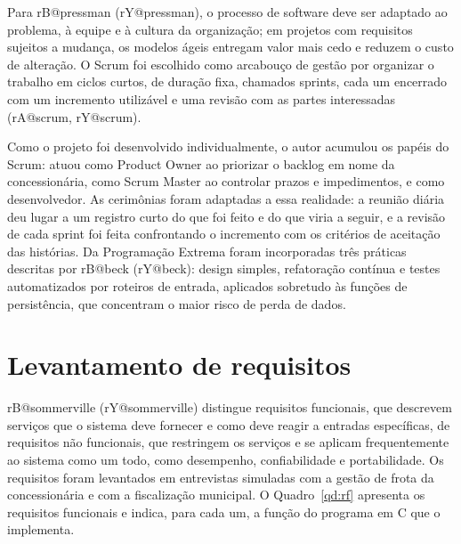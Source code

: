 \documentclass[12pt,a4paper,oneside]{report}
\makeatletter
\renewcommand{\cite}[1]{(\csname rA@#1\endcsname, \csname rY@#1\endcsname)}
\newcommand{\citeonline}[1]{\csname rB@#1\endcsname{} (\csname rY@#1\endcsname)}
\makeatother
\begin{document}
Para \citeonline{pressman}, o processo de software deve ser adaptado ao problema, à equipe e à cultura da
organização; em projetos com requisitos sujeitos a mudança, os modelos ágeis entregam valor mais cedo e
reduzem o custo de alteração. O Scrum foi escolhido como arcabouço de gestão por organizar o trabalho em
ciclos curtos, de duração fixa, chamados sprints, cada um encerrado com um incremento utilizável e uma
revisão com as partes interessadas \cite{scrum}.

Como o projeto foi desenvolvido individualmente, o autor acumulou os papéis do Scrum: atuou como
Product Owner ao priorizar o backlog em nome da concessionária, como Scrum Master ao controlar prazos e
impedimentos, e como desenvolvedor. As cerimônias foram adaptadas a essa realidade: a reunião diária deu
lugar a um registro curto do que foi feito e do que viria a seguir, e a revisão de cada sprint foi feita
confrontando o incremento com os critérios de aceitação das histórias. Da Programação Extrema foram
incorporadas três práticas descritas por \citeonline{beck}: design simples, refatoração contínua e testes
automatizados por roteiros de entrada, aplicados sobretudo às funções de persistência, que concentram o
maior risco de perda de dados.

\section{Levantamento de requisitos}

\citeonline{sommerville} distingue requisitos funcionais, que descrevem serviços que o sistema deve
fornecer e como deve reagir a entradas específicas, de requisitos não funcionais, que restringem os
serviços e se aplicam frequentemente ao sistema como um todo, como desempenho, confiabilidade e
portabilidade. Os requisitos foram levantados em entrevistas simuladas com a gestão de frota da
concessionária e com a fiscalização municipal. O Quadro~\ref{qd:rf} apresenta os requisitos funcionais e
indica, para cada um, a função do programa em C que o implementa.
\end{document}
